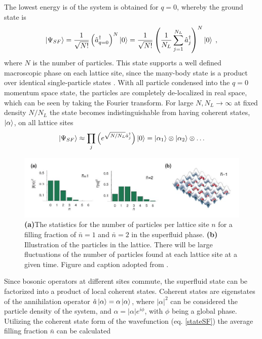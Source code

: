The lowest energy is of the system is obtained for $q = 0$, whereby the ground state is
\begin{equation}
	\ket{\Psi_{SF}} =  \frac{1}{\sqrt{N!}} \left( \hat{a}_{q = 0}^{\dag} \right) ^N \ket{0} = \frac{1}{\sqrt{N!}} \left( \frac{1}{N_L} \sum_{j = 1}^{N_L} \hat{a}_{j}^{\dag} \right) ^N \ket{0} \; ,
\end{equation} 
where $N$ is the number of particles. This state supports a well defined macroscopic phase on each lattice site, since the many-body state is a product over identical single-particle states \cite{greiner}. With all particle condensed into the $q = 0$ momentum space state, the particles are completely de-localized in real space, which can be seen by taking the Fourier transform. For large $N,N_L \rightarrow \infty$ at fixed density $N/N_L$ the state becomes indistinguishable from having coherent states, $\ket{\alpha} $, on all lattice sites \cite{manybodyBloch}
\begin{equation}
	\ket{\Psi_{SF}} \approx \prod_j \left( e^{\sqrt{N/N_L} \hat{a}_{j}^{\dag}} \right) \ket{0} = \ket{\alpha_1} \otimes \ket{\alpha_2} \otimes \ldots
	\label{stateSF}
\end{equation}
\begin{figure}[!h]
	\centering
	\includegraphics[width=0.8\columnwidth]{Figures/f(n)_SF.JPG} 
	\caption{\textbf{(a)}The statistics for the number of particles per lattice site $n$ for a filling fraction of $\bar{n}=1$ and $\bar{n}=2$ in the superfluid phase. \textbf{(b)} Illustration of the particles in the lattice. There will be large fluctuations of the number of particles found at each lattice site at a given time. Figure and caption adopted from \cite{greiner}.}
	\label{fig:f(n)_SF} 
\end{figure}
Since bosonic operators at different sites commute, the superfluid state can be factorized into a product of local coherent states.
Coherent states are eigenstates of the annihilation operator $\hat{a} \ket{\alpha} = \alpha \ket{\alpha}$, where $|\alpha |^2$ can be considered the particle density of the system, and $\alpha = |\alpha| e^{i \phi}$, with $\phi$ being a global phase. Utilizing the coherent state form of the wavefunction (eq. \eqref{stateSF}) the average filling fraction $\bar{n}$ can be calculated
